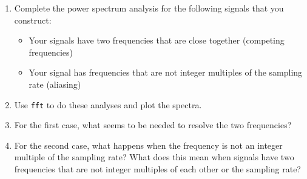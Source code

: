 \begin{enumerate}
\def\labelenumi{\arabic{enumi}.}
\tightlist
\item
  Complete the power spectrum analysis for the following signals that
  you construct:

  \begin{itemize}
  \tightlist
  \item
    Your signals have two frequencies that are close together (competing
    frequencies)
  \item
    Your signal has frequencies that are not integer multiples of the
    sampling rate (aliasing)
  \end{itemize}
\item
  Use \texttt{fft} to do these analyses and plot the spectra.
\item
  For the first case, what seems to be needed to resolve the two
  frequencies?
\item
  For the second case, what happens when the frequency is not an integer
  multiple of the sampling rate? What does this mean when signals have
  two frequencies that are not integer multiples of each other or the
  sampling rate?
\end{enumerate}

\begin{Shaded}
\begin{Highlighting}[]
\end{Highlighting}
\end{Shaded}
